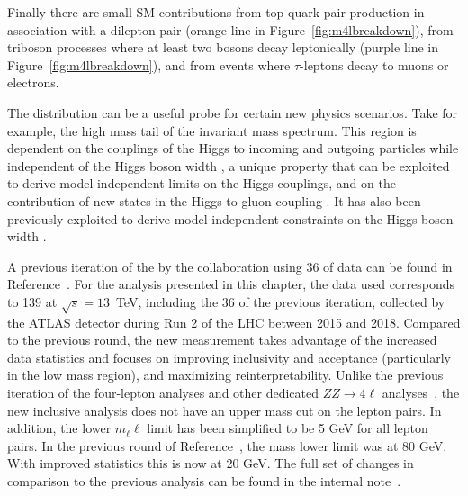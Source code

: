 Finally there are small SM contributions from top-quark pair production in association with a dilepton pair (orange line in Figure~\ref{fig:m4lbreakdown}), from triboson processes where at least two bosons decay leptonically (purple line in Figure~\ref{fig:m4lbreakdown}), and from events where $\tau$-leptons decay to muons or electrons. 

The \mFourL{} distribution can be a useful probe for certain new physics scenarios. Take for example, the high mass tail of the invariant mass spectrum. This region is dependent on the couplings of the Higgs to incoming and outgoing particles while independent of the Higgs boson width \cite{Campbell_2016}, a unique property that can be exploited to derive model-independent limits on the Higgs couplings, and on the  contribution of new states in the Higgs to gluon coupling \cite{Cacciapaglia_2014}. It has also been previously exploited to derive model-independent constraints on the Higgs boson width \cite{Caola_2013}. 

A previous iteration of the \mFourL{} by the \ATLAS collaboration using \unit{36}{\invfb} of data can be found in Reference~\cite{Aaboud:2019lxo}. For the analysis presented in this chapter, the data used corresponds to \unit{139}{\invfb} at $\sqrt{s}=13$~TeV, including the \unit{36}{\invfb} of the previous iteration, collected by the ATLAS detector during Run 2 of the LHC between 2015 and 2018. Compared to the previous round, the new \mFourL{} measurement takes advantage of the increased data statistics and focuses on improving inclusivity and acceptance (particularly in the low mass region), and maximizing reinterpretability. Unlike the previous iteration of the four-lepton analyses and other dedicated $ZZ\rightarrow 4\ell$ analyses~\cite{Sirunyan:s10052-018-5567-9,Aaboud:97.032005}, the new inclusive \mFourL{} analysis does not have an upper mass cut on the lepton pairs. In addition, the lower $m_\ell\ell$ limit has been simplified to be 5 GeV for all lepton pairs. In the previous round of Reference~\cite{Aaboud:2019lxo}, the \mFourL{} mass lower limit was at 80 GeV. With improved statistics this is now at 20 GeV. The full set of changes in comparison to the previous analysis can be found in the internal note~\cite{m4l_internalnote}. 

